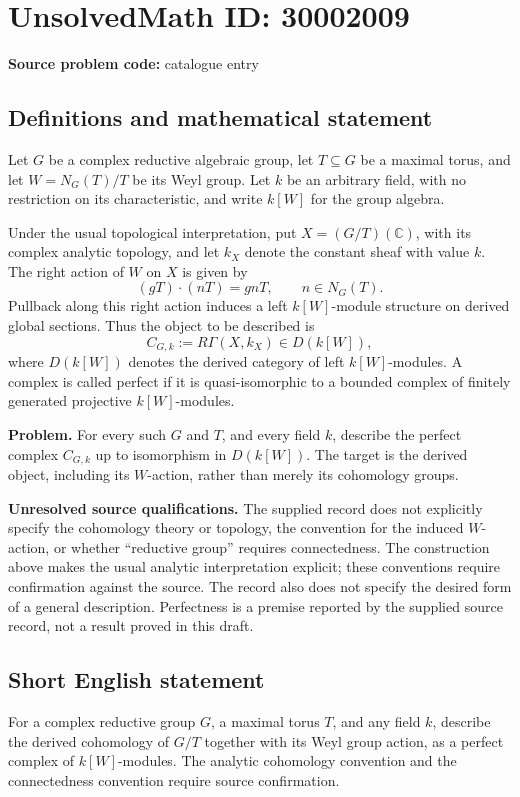 \documentclass[11pt]{article}
\newcommand{\C}{\mathbb{C}}
\begin{document}
\section*{UnsolvedMath ID: 30002009}
\textbf{Source problem code:} catalogue entry
\subsection{Definitions and mathematical statement}
Let \(G\) be a complex reductive algebraic group, let \(T\subseteq G\) be a maximal torus, and let \(W=N_G(T)/T\) be its Weyl group. Let \(k\) be an arbitrary field, with no restriction on its characteristic, and write \(k[W]\) for the group algebra.

Under the usual topological interpretation, put \(X=(G/T)(\C)\), with its complex analytic topology, and let \(k_X\) denote the constant sheaf with value \(k\). The right action of \(W\) on \(X\) is given by
\[
(gT)\cdot(nT)=gnT,\qquad n\in N_G(T).
\]
Pullback along this right action induces a left \(k[W]\)-module structure on derived global sections. Thus the object to be described is
\[
C_{G,k}:=R\Gamma(X,k_X)\in D(k[W]),
\]
where \(D(k[W])\) denotes the derived category of left \(k[W]\)-modules. A complex is called perfect if it is quasi-isomorphic to a bounded complex of finitely generated projective \(k[W]\)-modules.

\textbf{Problem.} For every such \(G\) and \(T\), and every field \(k\), describe the perfect complex \(C_{G,k}\) up to isomorphism in \(D(k[W])\). The target is the derived object, including its \(W\)-action, rather than merely its cohomology groups.

\textbf{Unresolved source qualifications.} The supplied record does not explicitly specify the cohomology theory or topology, the convention for the induced \(W\)-action, or whether ``reductive group'' requires connectedness. The construction above makes the usual analytic interpretation explicit; these conventions require confirmation against the source. The record also does not specify the desired form of a general description. Perfectness is a premise reported by the supplied source record, not a result proved in this draft.
\subsection{Short English statement}
For a complex reductive group \(G\), a maximal torus \(T\), and any field \(k\), describe the derived cohomology of \(G/T\) together with its Weyl group action, as a perfect complex of \(k[W]\)-modules. The analytic cohomology convention and the connectedness convention require source confirmation.
\end{document}
